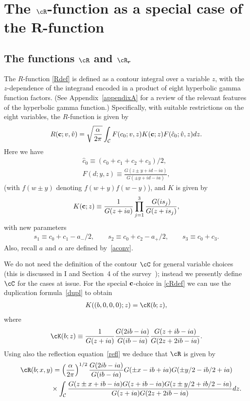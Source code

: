 \section[The $\cR$-function as a special case of the $R$-function]{The $\boldsymbol{\cR}$-function as a special case of the $\boldsymbol{R}$-function}\label{section2}

\subsection[The functions $\cR$ and $\cR_r$]{The functions $\boldsymbol{\cR}$ and $\boldsymbol{\cR_r}$}\label{section2.1}

The $R$-function \eqref{Rdef} is def\/ined as a contour integral over a variable $z$, with the $z$-dependence of the integrand encoded in a product of eight hyperbolic gamma function factors.
(See Appendix~\ref{appendixA} for a review of the relevant features of the hyperbolic gamma function.)
Specif\/ically,
with suitable restrictions on the eight variables, the $R$-function is given by
\begin{gather}\label{R}
R({\bf c};v,\hat{v})=\sqrt{\frac{\alpha}{2\pi}}\int_{\cal
C}F(c_0;v,z)K({\bf c};z)F(\hat{c}_0;\hat{v},z)dz.
\end{gather}
Here we have
\begin{gather}
\hat{c}_0\equiv (c_0+c_1+c_2+c_3)/2,
\\
\label{F}
F(d;y,z)\equiv
\frac{G(z\pm y+id-ia)}{G(\pm y+id-ia)},
\end{gather}
(with $f(w\pm y)$ denoting $f(w+y)f(w-y)$), and $K$ is given by
\begin{gather}\label{K}
K({\bf c};z)\equiv
\frac{1}{G(z+ia)}\prod_{j=1}^3\frac{G(is_j)}{G(z+is_j)},
\end{gather}
with new parameters
\begin{gather}\label{defsj}
s_1\equiv c_0+c_1-a_{-}/2,\qquad s_2\equiv c_0+c_2-a_{+}/2,\qquad s_3\equiv
c_0+c_3.
\end{gather}
Also, recall $a$ and $\alpha$ are def\/ined by~\eqref{aconv}.

We do not need the def\/inition of the contour $\cC$ for general variable choices (this is discussed in I and Section~4 of the survey~\cite{Rsurv}); instead we presently def\/ine $\cC$ for the cases at issue. For the special ${\bf c}$-choice in \eqref{cRdef} we can use the duplication formula~\eqref{dupl} to obtain
\begin{gather}
K((b,0,0,0);z)=\cK(b;z),
\end{gather}
where
\begin{gather}
\cK(b;z)\equiv \frac{1}{G(z+ia)}\frac{G(2ib-ia)}{G(ib-ia)}\frac{G(z+ib-ia)}{G(2z+2ib-ia)}.
\end{gather}
Using also the ref\/lection equation~\eqref{refl}
we deduce that $\cR$ is given by
\begin{gather}
\cR(b;x,y)     =     \left(\frac{\alpha}{2\pi}\right)^{1/2}\frac{G(2ib-ia)}{G(ib-ia)}G(\pm x-ib+ia)G(\pm y/2-ib/2+ia)
\nonumber \\
\phantom{\cR(b;x,y)     =}{}\times \int_{\cal
C}\frac{G(z\pm x+ib-ia)G(z+ib-ia)G(z\pm y/2+ib/2-ia)}{G(z+ia)G(2z+2ib-ia)}dz.\label{cRcont}
\end{gather}

